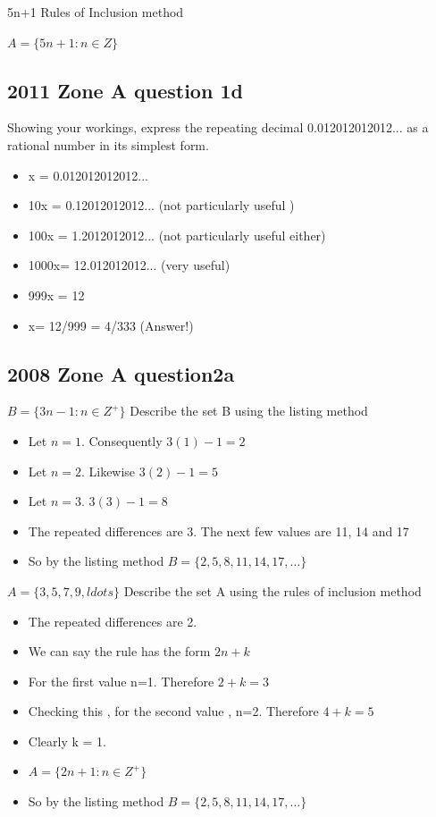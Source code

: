 \documentclass[]{report}
\begin{document}
5n+1 Rules of Inclusion method

$A = \{5n+1: n \in Z \}$

\subsection*{2011 Zone A question 1d}

Showing your workings, express the repeating decimal 0.012012012012...
as a rational number in its simplest form.


\begin{itemize}
\item x = 0.012012012012...
\item 10x = 0.12012012012... (not particularly useful )
\item 100x = 1.2012012012... (not particularly useful either)
\item 1000x= 12.012012012... (very useful)
\item 999x = 12
\item x= 12/999 = 4/333 (Answer!)
\end{itemize}


\subsection*{2008  Zone A question2a}
$B = \{3n-1 :n \in Z^{+} \}$
Describe the set B using the listing method

\begin{itemize}
\item Let $n=1$. Consequently $3(1)-1 =2$
\item Let $n=2$. Likewise $3(2)-1 =5$
\item Let $n=3$. $3(3)-1 = 8 $
\item The repeated differences are 3. The next few values are 11, 14 and 17
\item So by the listing method $B= \{2,5,8,11,14,17,\ldots\}$
\end{itemize}

$A = \{3,5,7,9,ldots \}$
Describe the set A using the rules of inclusion method

\begin{itemize}
\item The repeated differences are 2.
\item We can say the rule has the form $2n+k$
\item For the first value n=1. Therefore $2+k=3$
\item Checking this , for the second value , n=2. Therefore $4+k=5$
\item Clearly k = 1.
\item $A = \{2n+1 :n \in Z^{+} \}$
\item So by the listing method $B= \{2,5,8,11,14,17,\ldots\}$
\end{itemize}
\end{document}
